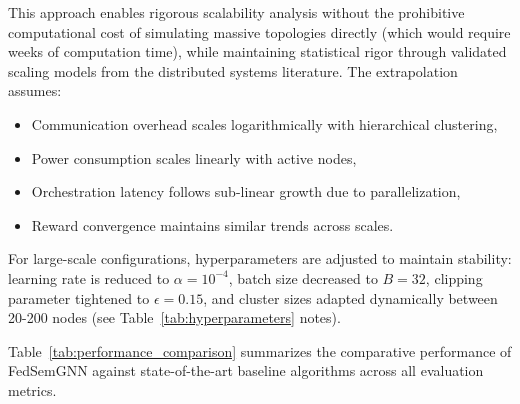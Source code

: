 This approach enables rigorous scalability analysis without the prohibitive computational cost of simulating massive topologies directly (which would require weeks of computation time), while maintaining statistical rigor through validated scaling models from the distributed systems literature. The extrapolation assumes:
\begin{itemize}
	\item Communication overhead scales logarithmically with hierarchical clustering,
	\item Power consumption scales linearly with active nodes,
	\item Orchestration latency follows sub-linear growth due to parallelization,
	\item Reward convergence maintains similar trends across scales.
\end{itemize}

For large-scale configurations, hyperparameters are adjusted to maintain stability: learning rate is reduced to $\alpha = 10^{-4}$, batch size decreased to $B = 32$, clipping parameter tightened to $\epsilon = 0.15$, and cluster sizes adapted dynamically between 20-200 nodes (see Table~\ref{tab:hyperparameters} notes).

Table~\ref{tab:performance_comparison} summarizes the comparative performance of FedSemGNN against state-of-the-art baseline algorithms across all evaluation metrics.

